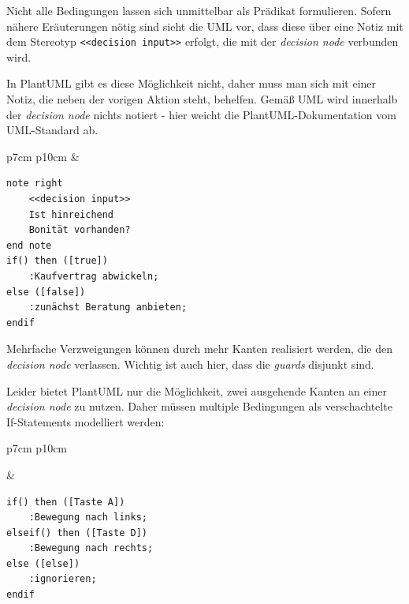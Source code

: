 \documentclass[10pt]{scrartcl}
\begin{document}
Nicht alle Bedingungen lassen sich unmittelbar als Prädikat formulieren. Sofern nähere Eräuterungen nötig sind sieht die UML vor, dass diese über eine Notiz mit dem Stereotyp \texttt{<<decision input>>} erfolgt, die mit der \textit{decision node} verbunden wird.

In PlantUML gibt es diese Möglichkeit nicht, daher muss man sich mit einer Notiz, die neben der vorigen Aktion steht, behelfen. Gemäß UML wird innerhalb der \textit{decision node} nichts notiert - hier weicht die PlantUML-Dokumentation vom UML-Standard ab.

\begin{tabular}[b]{p{7cm} p{10cm}}
	&
	\begin{lstlisting}[style=plantuml]
note right
	<<decision input>>
	Ist hinreichend 
	Bonität vorhanden?
end note
if() then ([true])
	:Kaufvertrag abwickeln;
else ([false])
	:zunächst Beratung anbieten;
endif
	\end{lstlisting}
\end{tabular}
\newpage
Mehrfache Verzweigungen können durch mehr Kanten realisiert werden, die den \textit{decision node} verlassen. Wichtig ist auch hier, dass die \textit{guards} disjunkt sind.

Leider bietet PlantUML nur die Möglichkeit, zwei ausgehende Kanten an einer \textit{decision node} zu nutzen. Daher müssen multiple Bedingungen als verschachtelte If-Statements modelliert werden:

\begin{tabular}[b]{p{7cm} p{10cm}}
	
	&
	
	\begin{lstlisting}[style=plantuml]
if() then ([Taste A])
	:Bewegung nach links;
elseif() then ([Taste D])
	:Bewegung nach rechts;
else ([else])
	:ignorieren;
endif
	\end{lstlisting}
\end{tabular}
\end{document}
